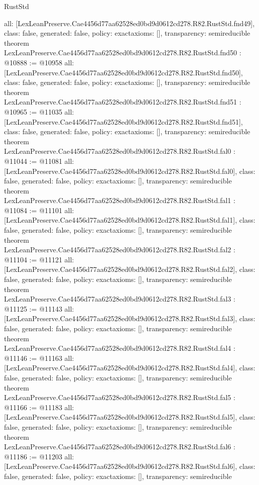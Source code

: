 \begin{lexlean}{RustStd}
\begin{coremodule}
{  all: [LexLeanPreserve.Cae4456d77aa62528ed0bd9d0612cd278.R82.RustStd.fnd49],
  class: false,
  generated: false,
  policy: exact{axioms: []},
  transparency: semireducible
}
theorem LexLeanPreserve.Cae4456d77aa62528ed0bd9d0612cd278.R82.RustStd.fnd50 : @10888 := @10958 {
  all: [LexLeanPreserve.Cae4456d77aa62528ed0bd9d0612cd278.R82.RustStd.fnd50],
  class: false,
  generated: false,
  policy: exact{axioms: []},
  transparency: semireducible
}
theorem LexLeanPreserve.Cae4456d77aa62528ed0bd9d0612cd278.R82.RustStd.fnd51 : @10965 := @11035 {
  all: [LexLeanPreserve.Cae4456d77aa62528ed0bd9d0612cd278.R82.RustStd.fnd51],
  class: false,
  generated: false,
  policy: exact{axioms: []},
  transparency: semireducible
}
theorem LexLeanPreserve.Cae4456d77aa62528ed0bd9d0612cd278.R82.RustStd.fal0 : @11044 := @11081 {
  all: [LexLeanPreserve.Cae4456d77aa62528ed0bd9d0612cd278.R82.RustStd.fal0],
  class: false,
  generated: false,
  policy: exact{axioms: []},
  transparency: semireducible
}
theorem LexLeanPreserve.Cae4456d77aa62528ed0bd9d0612cd278.R82.RustStd.fal1 : @11084 := @11101 {
  all: [LexLeanPreserve.Cae4456d77aa62528ed0bd9d0612cd278.R82.RustStd.fal1],
  class: false,
  generated: false,
  policy: exact{axioms: []},
  transparency: semireducible
}
theorem LexLeanPreserve.Cae4456d77aa62528ed0bd9d0612cd278.R82.RustStd.fal2 : @11104 := @11121 {
  all: [LexLeanPreserve.Cae4456d77aa62528ed0bd9d0612cd278.R82.RustStd.fal2],
  class: false,
  generated: false,
  policy: exact{axioms: []},
  transparency: semireducible
}
theorem LexLeanPreserve.Cae4456d77aa62528ed0bd9d0612cd278.R82.RustStd.fal3 : @11125 := @11143 {
  all: [LexLeanPreserve.Cae4456d77aa62528ed0bd9d0612cd278.R82.RustStd.fal3],
  class: false,
  generated: false,
  policy: exact{axioms: []},
  transparency: semireducible
}
theorem LexLeanPreserve.Cae4456d77aa62528ed0bd9d0612cd278.R82.RustStd.fal4 : @11146 := @11163 {
  all: [LexLeanPreserve.Cae4456d77aa62528ed0bd9d0612cd278.R82.RustStd.fal4],
  class: false,
  generated: false,
  policy: exact{axioms: []},
  transparency: semireducible
}
theorem LexLeanPreserve.Cae4456d77aa62528ed0bd9d0612cd278.R82.RustStd.fal5 : @11166 := @11183 {
  all: [LexLeanPreserve.Cae4456d77aa62528ed0bd9d0612cd278.R82.RustStd.fal5],
  class: false,
  generated: false,
  policy: exact{axioms: []},
  transparency: semireducible
}
theorem LexLeanPreserve.Cae4456d77aa62528ed0bd9d0612cd278.R82.RustStd.fal6 : @11186 := @11203 {
  all: [LexLeanPreserve.Cae4456d77aa62528ed0bd9d0612cd278.R82.RustStd.fal6],
  class: false,
  generated: false,
  policy: exact{axioms: []},
  transparency: semireducible
}
\end{coremodule}
\end{lexlean}
